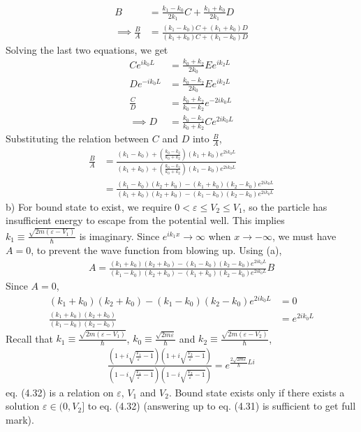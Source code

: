 \documentclass[12pt]{book} %
\numberwithin{equation}{chapter}
\def\e{\varepsilon}
\begin{document}
\begin{solbox}
\begin{align*}
B&=\frac{k_{1}-k_{0}}{2k_{1}}C+\frac{k_{1}+k_{0}}{2k_{1}}D\\
\implies \frac{B}{A}&=\frac{(k_{1}-k_{0})C+(k_{1}+k_{0})D}{(k_{1}+k_{0})C+(k_{1}-k_{0})D}
\end{align*}
Solving the last two equations, we get
\begin{align*}
Ce^{ik_{0}L}&=\frac{k_{0}+k_{2}}{2k_{0}}Ee^{ik_{2}L}\\
De^{-ik_{0}L}&=\frac{k_{0}-k_{2}}{2k_{0}}Ee^{ik_{2}L}\\
\frac{C}{D}&=\frac{k_{0}+k_{2}}{k_{0}-k_{2}}e^{-2ik_{0}L}\\
\implies D&=\frac{k_{0}-k_{2}}{k_{0}+k_{2}}Ce^{2ik_{0}L}
\end{align*}
Substituting the relation between $C$ and $D$ into $\frac{B}{A}$,
\begin{align*}
\frac{B}{A}&=\frac{(k_{1}-k_{0})+\left(\frac{k_{0}-k_{2}}{k_{0}+k_{2}}\right)(k_{1}+k_{0})e^{2ik_{0}L}}{(k_{1}+k_{0})+\left(\frac{k_{0}-k_{2}}{k_{0}+k_{2}}\right)(k_{1}-k_{0})e^{2ik_{0}L}}\\
&=\frac{(k_{1}-k_{0})(k_{2}+k_{0})-(k_{1}+k_{0})(k_{2}-k_{0})e^{2ik_{0}L}}{(k_{1}+k_{0})(k_{2}+k_{0})-(k_{1}-k_{0})(k_{2}-k_{0})e^{2ik_{0}L}}
\end{align*}
b) For bound state to exist, we require $0<\e\leq V_{2}\leq V_{1}$, so the particle has insufficient energy to escape from the potential well. This implies $k_{1}\equiv\frac{\sqrt{2m(\e-V_{1})}}{\hbar}$ is imaginary.\bigskip\newline
Since $e^{ik_{1}x}\to\infty$ when $x\to-\infty$, we must have $A=0$, to prevent the wave function from blowing up. Using (a),
\begin{align*}
A=\frac{(k_{1}+k_{0})(k_{2}+k_{0})-(k_{1}-k_{0})(k_{2}-k_{0})e^{2ik_{0}L}}{(k_{1}-k_{0})(k_{2}+k_{0})-(k_{1}+k_{0})(k_{2}-k_{0})e^{2ik_{0}L}}B
\end{align*}
Since $A=0$,
\begin{align}
(k_{1}+k_{0})(k_{2}+k_{0})-(k_{1}-k_{0})(k_{2}-k_{0})e^{2ik_{0}L}&=0\nonumber\\
\frac{(k_{1}+k_{0})(k_{2}+k_{0})}{(k_{1}-k_{0})(k_{2}-k_{0})}&=e^{2ik_{0}L}
\end{align}
Recall that $k_{1}\equiv\frac{\sqrt{2m(\e-V_{1})}}{\hbar}$, $k_{0}\equiv\frac{\sqrt{2m\e}}{\hbar}$ and $k_{2}\equiv\frac{\sqrt{2m(\e-V_{2})}}{\hbar}$,
\begin{align}
\frac{\left(1+i\sqrt{\frac{V_{1}}{\e}-1}\right)\left(1+i\sqrt{\frac{V_{2}}{\e}-1}\right)}{\left(1-i\sqrt{\frac{V_{1}}{\e}-1}\right)\left(1-i\sqrt{\frac{V_{2}}{\e}-1}\right)}=e^{\frac{2\sqrt{2m\e}}{\hbar}Li}
\end{align}
eq. (4.32) is a relation on $\e$, $V_{1}$ and $V_{2}$. Bound state exists only if there exists a solution $\e\in(0, V_{2}]$ to eq. (4.32) (answering up to eq. (4.31) is sufficient to get full mark).
\end{solbox}
\end{document}
